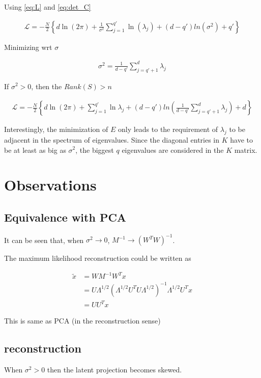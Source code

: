 \documentclass[10pt,onecolumn,letterpaper]{article}
\begin{document}
Using \eqref{eq:L} and \eqref{eq:det_C}

\begin{align}
    \mathcal{L} = -\frac{N}{2}\left\{d \ln(2\pi)+\frac{1}{\sigma^2}\sum_{j=1}^{q'}\ln(\lambda_j)+(d-q')ln(\sigma^2)+q' \right\}
\end{align}

Minimizing wrt $\sigma$

\begin{align}
\sigma^2=\frac{1}{d-q'}\sum_{j=q'+1}^{d}\lambda_j
\end{align}


If $\sigma^2>0$, then the $Rank(S)>n$

\begin{align}
    \mathcal{L} = -\frac{N}{2}\left\{d \ln(2\pi)+\sum_{j=1}^{q'}\ln\lambda_j+(d-q')ln\left(\frac{1}{d-q'}\sum_{j=q'+1}^{d}\lambda_j\right)+d \right\}
\end{align}


Interestingly, the minimization of $E$ only leads to the requirement of $\lambda_j$ to be adjacent in the spectrum of eigenvalues. Since the diagonal entries in $K$ have to be at least as big as $\sigma^2$, the biggest $q$ eigenvalues are considered in the $K$ matrix.

\section{Observations}

\subsection{Equivalence with PCA}
It can be seen that, when $\sigma^2 \rightarrow 0$, $M^{-1}\rightarrow(W^TW)^{-1}$.

The maximum likelihood reconstruction could be written as

\begin{align}
\tilde x &= WM^{-1}W^Tx\\
&= U\Lambda^{1/2}(\Lambda^{1/2}U^TU\Lambda^{1/2})^{-1}\Lambda^{1/2}U^Tx\\
&= UU^Tx
\end{align}

This is same as PCA (in the reconstruction sense)

\subsection{reconstruction}
When $\sigma^2 > 0$ then the latent projection becomes skewed.
\end{document}

